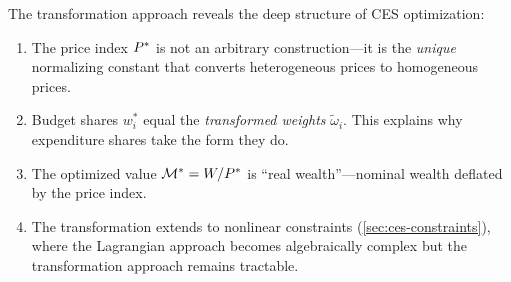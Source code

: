 \begin{calloutimportant}
The transformation approach reveals the deep structure of CES optimization:
\begin{enumerate}[nosep]
\item The price index $P^{*}$ is not an arbitrary construction---it is the \emph{unique} normalizing constant that converts heterogeneous prices to homogeneous prices.
\item Budget shares $w_i^*$ equal the \emph{transformed weights} $\tilde{\omega}_i$. This explains why expenditure shares take the form they do.
\item The optimized value $\mathcal{M}^* = W/P^{*}$ is ``real wealth''---nominal wealth deflated by the price index.
\item The transformation extends to nonlinear constraints (\cref{sec:ces-constraints}), where the Lagrangian approach becomes algebraically complex but the transformation approach remains tractable.
\end{enumerate}
\end{calloutimportant}
